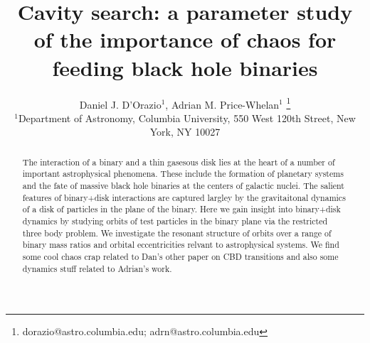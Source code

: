 \documentclass[usenatbib]{mn2e}
\begin{document}
\title{Cavity search: a parameter study of the importance of chaos for feeding black hole binaries}
\author[D. J. D'Orazio, Adrian M. Price-Whelan]{Daniel J. D'Orazio$^1$, Adrian M. Price-Whelan$^1$  
    \thanks{dorazio@astro.columbia.edu; adrn@astro.columbia.edu}\\
     $^1$Department of Astronomy, Columbia University, 550 West 120th Street, New York, NY 10027 
}




\maketitle


\begin{abstract}
The interaction of a binary and a thin gasesous disk lies at the heart
of a number of important astrophysical phenomena. These include the
formation of planetary systems and the fate of massive black hole
binaries at the centers of galactic nuclei.
The salient features of binary+disk interactions are captured largley
by the gravitaitonal dynamics of a disk of particles in the plane of
the binary.
Here we gain insight into binary+disk dynamics by studying orbits of
test particles in the binary plane via the restricted three body
problem.
We investigate the resonant structure of orbits over a range of binary
mass ratios and orbital eccentricities relvant to astrophysical
systems.
We find some cool chaos crap related to Dan's other paper on CBD
transitions and also some dynamics stuff related to Adrian's work.


\end{abstract}
\end{document}
